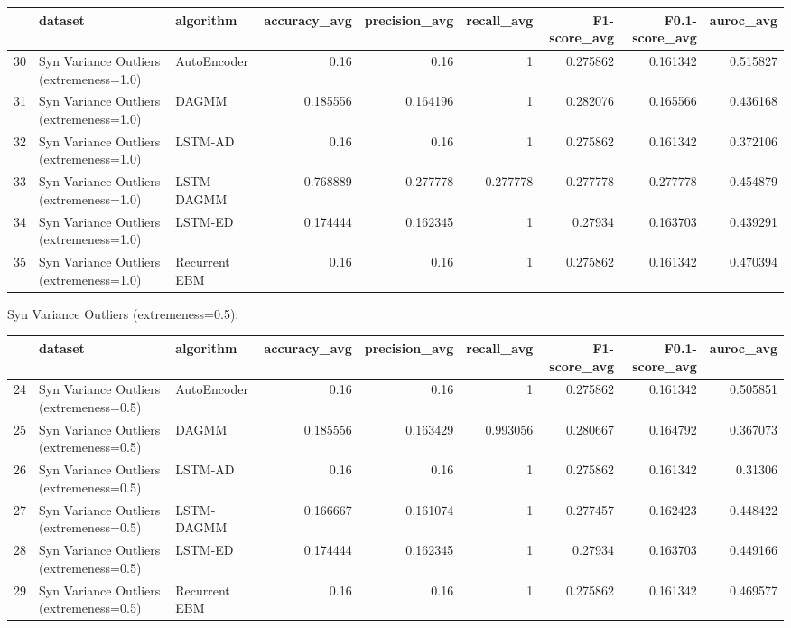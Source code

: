 \begin{tabular}{rllrrrrrr}
\hline
    & dataset                                 & algorithm     &   accuracy\_avg &   precision\_avg &   recall\_avg &   F1-score\_avg &   F0.1-score\_avg &   auroc\_avg \\
\hline
 30 & Syn Variance Outliers (extremeness=1.0) & AutoEncoder   &       0.16     &        0.16     &     1        &       0.275862 &         0.161342 &    0.515827 \\
 31 & Syn Variance Outliers (extremeness=1.0) & DAGMM         &       0.185556 &        0.164196 &     1        &       0.282076 &         0.165566 &    0.436168 \\
 32 & Syn Variance Outliers (extremeness=1.0) & LSTM-AD       &       0.16     &        0.16     &     1        &       0.275862 &         0.161342 &    0.372106 \\
 33 & Syn Variance Outliers (extremeness=1.0) & LSTM-DAGMM    &       0.768889 &        0.277778 &     0.277778 &       0.277778 &         0.277778 &    0.454879 \\
 34 & Syn Variance Outliers (extremeness=1.0) & LSTM-ED       &       0.174444 &        0.162345 &     1        &       0.27934  &         0.163703 &    0.439291 \\
 35 & Syn Variance Outliers (extremeness=1.0) & Recurrent EBM &       0.16     &        0.16     &     1        &       0.275862 &         0.161342 &    0.470394 \\
\hline
\end{tabular}

Syn Variance Outliers (extremeness=0.5):

\begin{tabular}{rllrrrrrr}
\hline
    & dataset                                 & algorithm     &   accuracy\_avg &   precision\_avg &   recall\_avg &   F1-score\_avg &   F0.1-score\_avg &   auroc\_avg \\
\hline
 24 & Syn Variance Outliers (extremeness=0.5) & AutoEncoder   &       0.16     &        0.16     &     1        &       0.275862 &         0.161342 &    0.505851 \\
 25 & Syn Variance Outliers (extremeness=0.5) & DAGMM         &       0.185556 &        0.163429 &     0.993056 &       0.280667 &         0.164792 &    0.367073 \\
 26 & Syn Variance Outliers (extremeness=0.5) & LSTM-AD       &       0.16     &        0.16     &     1        &       0.275862 &         0.161342 &    0.31306  \\
 27 & Syn Variance Outliers (extremeness=0.5) & LSTM-DAGMM    &       0.166667 &        0.161074 &     1        &       0.277457 &         0.162423 &    0.448422 \\
 28 & Syn Variance Outliers (extremeness=0.5) & LSTM-ED       &       0.174444 &        0.162345 &     1        &       0.27934  &         0.163703 &    0.449166 \\
 29 & Syn Variance Outliers (extremeness=0.5) & Recurrent EBM &       0.16     &        0.16     &     1        &       0.275862 &         0.161342 &    0.469577 \\
\hline
\end{tabular}

